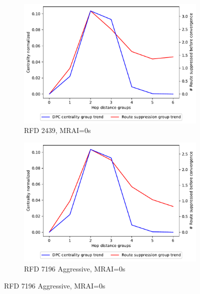 \begin{figure}[H]
     \centering
     \begin{subfigure}[b]{0.325\textwidth}
         \centering
         \includegraphics[width=\textwidth]{images/RFD/miceVSelephants/MultiMRAI/0/elephants/cisco_1000_RFD_nodeConvergence_centVSsup_trend.pdf}
         \caption{\scriptsize RFD 2439, MRAI=0s}
         \label{fig:1000_2439RFD_centVSsup_elephants_MRAI0}
     \end{subfigure}
     \hfill
     \begin{subfigure}[b]{0.325\textwidth}
         \centering
         \includegraphics[width=\textwidth]{images/RFD/miceVSelephants/MultiMRAI/0/elephants/cisco_1000_RFD_7196_aggressive_nodeConvergence_centVSsup_trend.pdf}
         \caption{\scriptsize RFD 7196 Aggressive, MRAI=0s}
         \label{fig:1000_7196RFDA_centVSsup_elephants_MRAI0}

\end{subfigure}
\end{figure}
